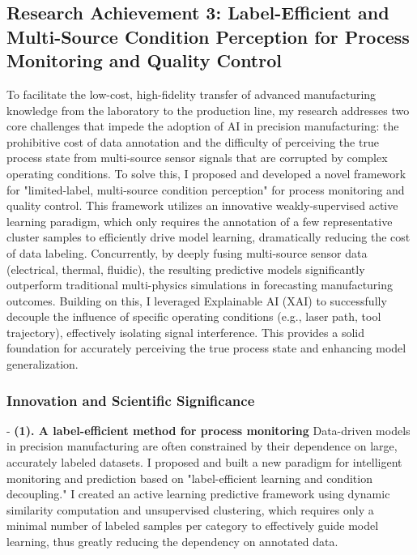 \documentclass{ResearchStatement}
\begin{document}
\clearpage

\subsection{Research Achievement 3: Label-Efficient and Multi-Source Condition Perception for Process Monitoring and Quality Control}
To facilitate the low-cost, high-fidelity transfer of advanced manufacturing knowledge from the laboratory to the production line, my research addresses two core challenges that impede the adoption of AI in precision manufacturing: the prohibitive cost of data annotation and the difficulty of perceiving the true process state from multi-source sensor signals that are corrupted by complex operating conditions. To solve this, I proposed and developed a novel framework for "limited-label, multi-source condition perception" for process monitoring and quality control. This framework utilizes an innovative weakly-supervised active learning paradigm, which only requires the annotation of a few representative cluster samples to efficiently drive model learning, dramatically reducing the cost of data labeling. Concurrently, by deeply fusing multi-source sensor data (electrical, thermal, fluidic), the resulting predictive models significantly outperform traditional multi-physics simulations in forecasting manufacturing outcomes. Building on this, I leveraged Explainable AI (XAI) to successfully decouple the influence of specific operating conditions (e.g., laser path, tool trajectory), effectively isolating signal interference. This provides a solid foundation for accurately perceiving the true process state and enhancing model generalization.

\subsubsection{Innovation and Scientific Significance}

- \textbf{(1). A label-efficient method for process monitoring}
Data-driven models in precision manufacturing are often constrained by their dependence on large, accurately labeled datasets. I proposed and built a new paradigm for intelligent monitoring and prediction based on "label-efficient learning and condition decoupling." I created an active learning predictive framework using dynamic similarity computation and unsupervised clustering, which requires only a minimal number of labeled samples per category to effectively guide model learning, thus greatly reducing the dependency on annotated data.
\end{document}
